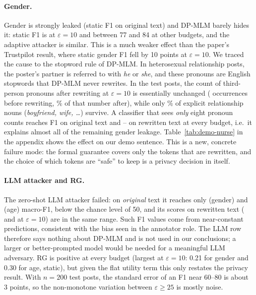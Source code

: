 \documentclass[11pt]{article}
\begin{document}
\paragraph{Gender.} Gender is strongly leaked (static \FGenSOrig{} F1 on original text) and DP-MLM barely hides it: static F1 is \FGenSTen{} at $\varepsilon=10$ and between 77 and 84 at other budgets, and the adaptive attacker is similar. This is a much weaker effect than the paper's Trustpilot result, where static gender F1 fell by 10 points at $\varepsilon=10$. We traced the cause to the stopword rule of DP-MLM. In heterosexual relationship posts, the poster's partner is referred to with \emph{he} or \emph{she}, and these pronouns are English stopwords that DP-MLM never rewrites. In the test posts, the count of third-person pronouns after rewriting at $\varepsilon=10$ is essentially unchanged (\PronN{} occurrences before rewriting, \PronKeep\% of that number after), while only \RelKeep\% of explicit relationship nouns (\emph{boyfriend, wife, \ldots}) survive. A classifier that sees \emph{only} eight pronoun counts reaches \PronOrig{} F1 on original text and \PronTen--\PronTwoFifty{} on rewritten text at every budget, i.e.\ it explains almost all of the remaining gender leakage. Table~\ref{tab:demo-nurse} in the appendix shows the effect on our demo sentence. This is a new, concrete failure mode: the formal guarantee covers only the tokens that are rewritten, and the choice of which tokens are ``safe'' to keep is a privacy decision in itself.

\paragraph{LLM attacker and RG.} The zero-shot LLM attacker failed: on \emph{original} text it reaches only \LLMAttGOrig{} (gender) and \LLMAttAOrig{} (age) macro-F1, below the chance level of 50, and its scores on rewritten text (\LLMAttGTen{} and \LLMAttATen{} at $\varepsilon=10$) are in the same range. Such F1 values come from near-constant predictions, consistent with the bias seen in the annotator role. The LLM row therefore says nothing about DP-MLM and is not used in our conclusions; a larger or better-prompted model would be needed for a meaningful LLM adversary. RG is positive at every budget (largest at $\varepsilon=10$: 0.21 for gender and 0.30 for age, static), but given the flat utility term this only restates the privacy result. With $n=200$ test posts, the standard error of an F1 near 60--80 is about 3 points, so the non-monotone variation between $\varepsilon \ge 25$ is mostly noise.
\end{document}
